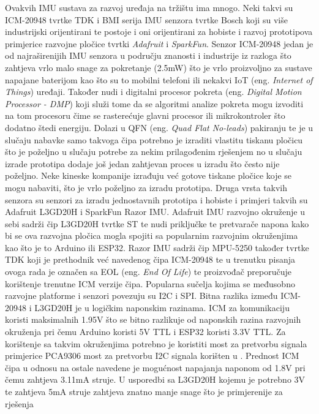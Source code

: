 \documentclass[times, utf8, diplomski]{fer}
\begin{document}
Ovakvih IMU sustava za razvoj uređaja na tržištu ima mnogo. Neki takvi su ICM-20948 tvrtke TDK i BMI serija IMU senzora tvrtke
Bosch koji su više industrijski orijentirani te postoje i oni orijentirani za hobiste i razvoj prototipova primjerice razvojne pločice
tvrtki \textit{Adafruit} i \textit{SparkFun}. Senzor ICM-20948 jedan je od najraširenijih IMU senzora u području znanosti i
industrije iz razloga što zahtjeva vrlo malo snage za pokretanje (2.5mW) \citep{ICM} što je vrlo proizvoljno 
za sustave napajane baterijom kao što su to mobilni telefoni ili nekakvi IoT (eng. \textit{Internet of Things}) uređaji.
Također nudi i digitalni procesor pokreta (eng. \textit{Digital Motion Processor - DMP}) koji služi tome da se algoritmi analize
pokreta mogu izvoditi na tom procesoru čime se rasterećuje glavni procesor ili mikrokontroler što dodatno štedi energiju. Dolazi u
QFN (eng. \textit{Quad Flat No-leads}) pakiranju te je u slučaju nabavke samo takvoga čipa potrebno je izraditi vlastitu tiskanu
pločicu što je poželjno u slučaju potrebe za nekim prilagođenim rješenjem no u slučaju izrade prototipa dodaje još jedan zahtjevan
proces u izradu što često nije poželjno. Neke kineske kompanije izrađuju već gotove tiskane pločice koje se mogu nabaviti, što je vrlo
poželjno za izradu prototipa. Druga vrsta takvih senzora su senzori za izradu jednostavnih prototipa i hobiste i primjeri takvih su
Adafruit L3GD20H i SparkFun Razor IMU. Adafruit IMU razvojno okruženje u sebi sadrži čip L3GD20H tvrtke ST te nudi priključke te
pretvarače napona kako bi se ova razvojna pločica mogla spojiti sa popularnim razvojnim okruženjima kao što je to Arduino ili
ESP32. Razor IMU sadrži čip MPU-5250 također tvrtke TDK koji je prethodnik već navedenog čipa ICM-20948 te u trenutku pisanja
ovoga rada je označen sa EOL (eng. \textit{End Of Life}) te proizvođač preporučuje korištenje trenutne ICM verzije čipa.
Popularna sučelja kojima se međusobno razvojne platforme i senzori povezuju su I2C i SPI. Bitna razlika između ICM-20948 i L3GD20H
je u logičkim naponskim razinama. ICM za komunikaciju koristi maksimalnih 1.95V \citep{ICM} što se bitno razlikuje od naponskih
razina razvojnih okruženja pri čemu Arduino koristi 5V TTL i ESP32 koristi 3.3V TTL. Za korištenje sa takvim okruženjima potrebno je
koristiti most za pretvorbu signala primjerice PCA9306 most za pretvorbu I2C signala korišten u \cite{mini_data_capture}.
Prednost ICM čipa u odnosu na ostale navedene je mogućnost napajanja naponom od 1.8V pri čemu zahtjeva 3.11mA struje.
U usporedbi sa L3GD20H kojemu je potrebno 3V te zahtjeva 5mA struje zahtjeva znatno manje snage što je primjerenije za rješenja
\end{document}
